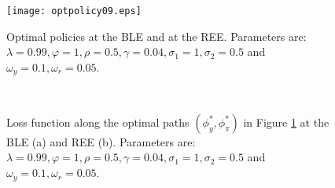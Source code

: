 \def\CTeXPreproc{Created by ctex v0.2.5, don't edit!}\documentclass[12pt]{article}
\numberwithin{equation}{section}
\begin{document}
\begin{figure}
    \begin{center}
     \texttt{[image: optpolicy09.eps]}
     \end{center}
   \caption{\label{opt09} Optimal policies at the BLE and at the REE. Parameters are: $\lambda=0.99, \varphi=1, \rho=0.5,\gamma=0.04,\sigma_1=1,\sigma_2=0.5$ and $\omega_y=0.1,\omega_r=0.05$.}
    \end{figure}


\begin{figure}
    \begin{center}
        \mbox{\quad
        }
   \end{center}
   \caption{\label{varopt09} Loss function along the optimal paths $(\phi_y^*, \phi_\pi^*)$ in Figure \ref{opt09} at the BLE (a) and REE (b). Parameters are:  $\lambda=0.99, \varphi=1, \rho=0.5,\gamma=0.04,\sigma_1=1,\sigma_2=0.5$ and $\omega_y=0.1,\omega_r=0.05$.}
    \end{figure}
\end{document}
